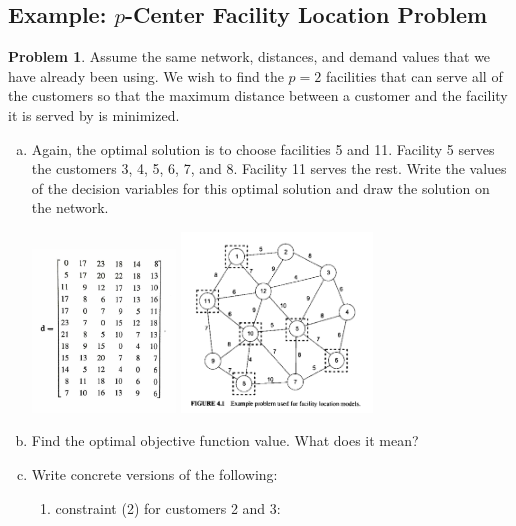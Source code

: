 \documentclass[11pt]{article}
\theoremstyle{definition}
\newtheorem{problem}{Problem}
\newcommand{\answerbox}[3]{%
  \fbox{%
    \begin{minipage}[#1]{#2}
      \hfill\vspace{#3}
    \end{minipage}
  }
}
\begin{document}
\newpage

\subsection{Example:  $p$-Center Facility Location Problem}

\begin{problem}
Assume the same network, distances, and demand values that we have already been using.  We wish to find the
$p=2$ facilities that can serve all of the customers so that the maximum distance between a customer and the facility it is served by is minimized.
\end{problem}

\begin{enumerate}[(a)]
\item Again, the optimal solution is to choose facilities 5 and 11. Facility 5 serves the customers 3, 4, 5, 6, 7, and 8.  Facility 11 serves the rest.  Write the values of the decision variables for this optimal solution and draw the solution on the network.

\hspace{-3cm} \includegraphics[width = 0.3\textwidth]{Distances} \includegraphics[width = 0.4\textwidth]{facloc} 
\phantom{\answerbox{b}{6.2cm}{5.8cm}}

\item Find the optimal objective function value.  What does it mean?

\vspace{1.7cm}
\item Write concrete versions of the following:
\begin{enumerate}[i]
\item constraint (2) for customers 2 and 3:


\end{enumerate}
\end{enumerate}
\end{document}
